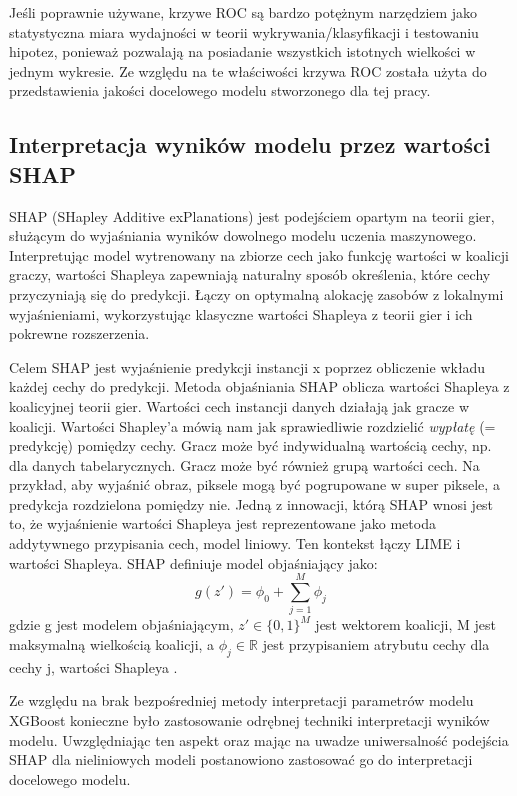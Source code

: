 \documentclass[polish, twoside, 12pt, a4paper]{article}
\theoremstyle{definition}
\theoremstyle{plain}
\theoremstyle{remark}
\begin{document}
Jeśli poprawnie używane, krzywe ROC są bardzo potężnym narzędziem jako statystyczna miara wydajności w teorii wykrywania/klasyfikacji i testowaniu hipotez, ponieważ pozwalają na posiadanie wszystkich istotnych wielkości w jednym wykresie. Ze względu na te właściwości krzywa ROC została użyta do przedstawienia jakości docelowego modelu stworzonego dla tej pracy.

\subsection{Interpretacja wyników modelu przez wartości SHAP}

SHAP (SHapley Additive exPlanations) jest podejściem opartym na teorii gier, służącym do wyjaśniania wyników dowolnego modelu uczenia maszynowego. Interpretując model wytrenowany na zbiorze cech jako funkcję wartości w koalicji graczy, wartości Shapleya zapewniają naturalny sposób określenia, które cechy przyczyniają się do predykcji. Łączy on optymalną alokację zasobów z lokalnymi wyjaśnieniami, wykorzystując klasyczne wartości Shapleya z teorii gier i ich pokrewne rozszerzenia.

Celem SHAP jest wyjaśnienie predykcji instancji x poprzez obliczenie wkładu każdej cechy do predykcji. Metoda objaśniania SHAP oblicza wartości Shapleya z koalicyjnej teorii gier. Wartości cech instancji danych działają jak gracze w koalicji. Wartości Shapley'a mówią nam jak sprawiedliwie rozdzielić \emph{wypłatę} (= predykcję) pomiędzy cechy. Gracz może być indywidualną wartością cechy, np. dla danych tabelarycznych. Gracz może być również grupą wartości cech. Na przykład, aby wyjaśnić obraz, piksele mogą być pogrupowane w super piksele, a predykcja rozdzielona pomiędzy nie. Jedną z innowacji, którą SHAP wnosi jest to, że wyjaśnienie wartości Shapleya jest reprezentowane jako metoda addytywnego przypisania cech, model liniowy. Ten kontekst łączy LIME i wartości Shapleya. SHAP definiuje model objaśniający jako:
\[ g(z') =  \phi_0 + \sum_{j=1}^{M}\phi_j \]
gdzie g jest modelem objaśniającym, \( z'\in\{0,1\}^{M}\)  jest wektorem koalicji, M jest maksymalną wielkością koalicji, a \( \phi_j \in\mathbb{R}\) jest przypisaniem atrybutu cechy dla cechy j, wartości Shapleya \cite{lundberg2017}.

Ze względu na brak bezpośredniej metody interpretacji parametrów modelu XGBoost konieczne było zastosowanie odrębnej techniki interpretacji wyników modelu. Uwzględniając ten aspekt oraz mając na uwadze uniwersalność podejścia SHAP dla nieliniowych modeli postanowiono zastosować go do interpretacji docelowego modelu.
\end{document}
